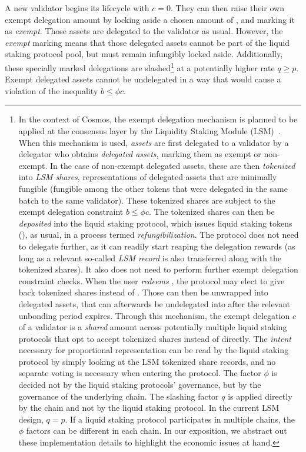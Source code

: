 A new validator begins its lifecycle with $c = 0$. They can then
raise their own exempt delegation amount by locking aside a
chosen amount of \asset, and marking it as \emph{exempt}. Those
assets are delegated to the validator as usual. However,
the \emph{exempt}
marking means that those delegated assets cannot be part of the liquid
staking protocol pool, but must remain infungibly locked aside. Additionally,
these specially marked delegations are slashed\footnote{In the context
of Cosmos, the exempt delegation mechanism is planned to be applied at the consensus
layer by the Liquidity Staking Module (LSM)~\cite{liquidity-staking-module}.
When this mechanism is used, \emph{assets} are first delegated to a validator by
a delegator who obtains \emph{delegated assets}, marking them as exempt or non-exempt.
In the case of non-exempt delegated assets, these are then
\emph{tokenized} into \emph{LSM shares}, representations of delegated assets that
are minimally fungible (fungible among the other tokens that were delegated in the
same batch to the same validator). These tokenized
shares are subject to the exempt delegation constraint $b \leq \phi c$. The tokenized shares
can then be \emph{deposited} into the liquid staking protocol, which issues liquid staking
tokens (\stassets), as usual, in a process termed \emph{refungibilization}.
The protocol does not need to delegate further, as it can readily start reaping the
delegation rewards (as long as a relevant so-called \emph{LSM record} is also transferred
along with the tokenized shares).
It also does not need to perform further exempt delegation constraint checks.
When the user \emph{redeems} \stassets, the protocol may elect to give
back tokenized shares instead of \assets. Those can then be unwrapped into delegated assets,
that can afterwards be undelegated into \assets after the relevant unbonding
period expires.
Through this mechanism, the exempt delegation $c$ of a validator is
a \emph{shared} amount across potentially multiple liquid staking
protocols that opt to accept tokenized shares
instead of \assets directly. The \emph{intent} necessary for proportional
representation can be read by the liquid staking protocol by simply
looking at the LSM tokenized share records, and no separate voting is
necessary when entering the protocol. The factor $\phi$ is decided not by the
liquid staking protocols' governance, but by the governance of
the underlying chain. The slashing factor $q$ is applied directly
by the chain and not by the liquid staking protocol.
In the current LSM design, $q = p$.
If a liquid staking protocol participates in
multiple chains, the $\phi$ factors can be different in each chain.
In our exposition, we abstract out these implementation details to highlight
the economic issues at hand.}
at a potentially higher rate $q \geq p$. Exempt delegated assets cannot
be undelegated in a way that would cause a violation of the inequality
$b \leq \phi c$.

